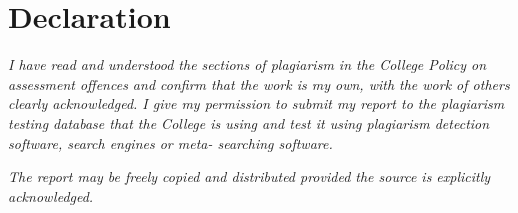 \documentclass[12pt, twoside, a4paper]{report}
\begin{document}

\chapter*{Declaration}

\vfill
\textit{I have read and understood the sections of plagiarism in the College Policy on assessment offences and confirm that the work is my own, with the work of others clearly acknowledged. I give my permission to submit my report to the plagiarism testing database that the College is using and test it using plagiarism detection software, search engines or meta- searching software.}

\textit{The report may be freely copied and distributed provided the source is explicitly acknowledged.}
\vfill

\cleardoublepage



\tableofcontents
\thispagestyle{empty}
\cleardoublepage
    
\setcounter{page}{1}





\printbibliography[heading=bibintoc,
title={References}]
\end{document}
